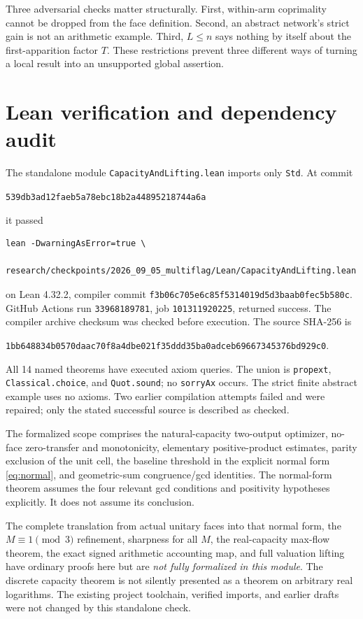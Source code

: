 \documentclass[11pt]{article}
\theoremstyle{definition}\newtheorem{definition}[theorem]{Definition}
\theoremstyle{remark}\newtheorem{remark}[theorem]{Remark}
\newcommand{\code}[1]{\texttt{\small #1}}
\begin{document}
Three adversarial checks matter structurally. First, within-arm coprimality cannot be dropped from the face definition. Second, an abstract network's strict gain is not an arithmetic example. Third, \(L\le n\) says nothing by itself about the first-apparition factor \(T\). These restrictions prevent three different ways of turning a local result into an unsupported global assertion.

\section{Lean verification and dependency audit}\label{sec:lean}
The standalone module \code{CapacityAndLifting.lean} imports only \code{Std}. At commit
\begin{center}\code{539db3ad12faeb5a78ebc18b2a44895218744a6a}\end{center}
it passed
\begin{verbatim}
lean -DwarningAsError=true \
  research/checkpoints/2026_09_05_multiflag/Lean/CapacityAndLifting.lean
\end{verbatim}
on Lean 4.32.2, compiler commit \code{f3b06c705e6c85f5314019d5d3baab0fec5b580c}. GitHub Actions run \code{33968189781}, job \code{101311920225}, returned success. The compiler archive checksum was checked before execution. The source SHA-256 is
\begin{center}\small\texttt{1bb648834b0570daac70f8a4dbe021f35ddd35ba0adceb69667345376bd929c0}.\end{center}

All 14 named theorems have executed axiom queries. The union is \code{propext}, \code{Classical.choice}, and \code{Quot.sound}; no \code{sorryAx} occurs. The strict finite abstract example uses no axioms. Two earlier compilation attempts failed and were repaired; only the stated successful source is described as checked.

The formalized scope comprises the natural-capacity two-output optimizer, no-face zero-transfer and monotonicity, elementary positive-product estimates, parity exclusion of the unit cell, the baseline threshold in the explicit normal form \eqref{eq:normal}, and geometric-sum congruence/gcd identities. The normal-form theorem assumes the four relevant gcd conditions and positivity hypotheses explicitly. It does not assume its conclusion.

The complete translation from actual unitary faces into that normal form, the \(M\equiv1\pmod3\) refinement, sharpness for all \(M\), the real-capacity max-flow theorem, the exact signed arithmetic accounting map, and full valuation lifting have ordinary proofs here but are \emph{not fully formalized in this module}. The discrete capacity theorem is not silently presented as a theorem on arbitrary real logarithms. The existing project toolchain, verified imports, and earlier drafts were not changed by this standalone check.
\end{document}
